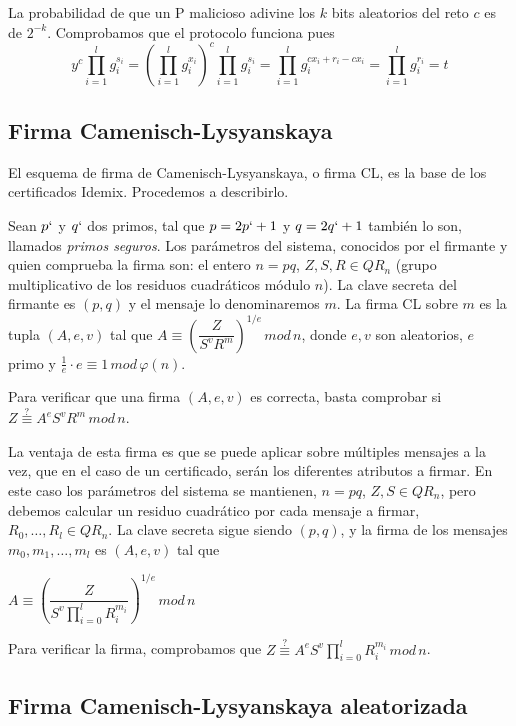 La probabilidad de que un P malicioso adivine los $k$ bits aleatorios del reto $c$ es de $2^{-k}$. Comprobamos que el protocolo funciona pues
\[
	y^c  \prod_{i=1}^{l} g_i^{s_i} =  \left( \prod_{i=1}^{l} g_i^{x_i} \right) ^c \prod_{i=1}^{l} g_i^{s_i} = \prod_{i=1}^{l} g_i^{c x_i + r_i -c x_i} = \prod_{i=1}^{l} g_i^{r_i} = t
\]




\subsection{Firma Camenisch-Lysyanskaya}

El esquema de firma de Camenisch-Lysyanskaya, o firma CL, es la base de los certificados Idemix. Procedemos a describirlo.

Sean $p`$ y $q`$ dos primos, tal que $p=2p`+1$ y $q=2q`+1$ también lo son, llamados \textit{primos seguros}. Los parámetros del sistema, conocidos por el firmante y quien comprueba la firma son: el entero $n=pq$, $Z,S,R\in QR_n$ (grupo multiplicativo de los residuos cuadráticos módulo $n$). La clave secreta del firmante es $(p,q)$ y el mensaje lo denominaremos $m$. La firma CL sobre $m$ es la tupla $(A,e,v)$ tal que $A \equiv \left( \dfrac{Z}{S^v R^m} \right) ^{1/e} \, mod \, n$, donde $e,v$ son aleatorios, $e$ primo y $\frac{1}{e}\cdot e \equiv 1 \, mod \, \varphi(n)$.

Para verificar que una firma $(A,e,v)$ es correcta, basta comprobar si $Z \overset{?}{\equiv} A^e S^v R^m \, mod \, n$.

\hfil

La ventaja de esta firma es que se puede aplicar sobre múltiples mensajes a la vez, que en el caso de un certificado, serán los diferentes atributos a firmar. En este caso los parámetros del sistema se mantienen, $n=pq$, $Z,S\in QR_n$, pero debemos calcular un residuo cuadrático por cada mensaje a firmar, $R_0,\dots,R_l\in QR_n$. La clave secreta sigue siendo $(p,q)$, y la firma de los mensajes $m_0,m_1,\dots,m_l$ es $(A,e,v)$ tal que
\begin{center}
	$A \equiv \left( \dfrac{Z}{S^v \prod_{i=0}^{l} R_i^{m_i} } \right) ^{1/e} \, mod \, n$
\end{center}

\hfil

Para verificar la firma, comprobamos que $Z \overset{?}{\equiv} A^e S^v \prod_{i=0}^{l} R_i^{m_i} \, mod \, n$.

\subsection{Firma Camenisch-Lysyanskaya aleatorizada}\label{CLrandomized}

